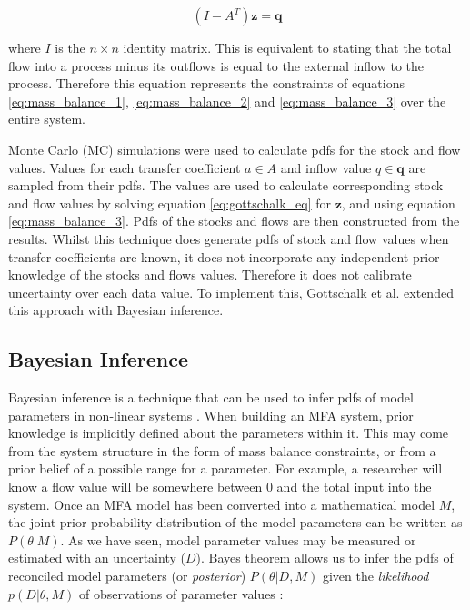 \documentclass[ %
                    author={Tom Jager},
                supervisor={Dr. Daniel Schien},
                    degree={MEng},
                     title={A Bayesian Inference Engine for Calibrating Uncertainty over UMIS Structured MFA Systems},
                  subtitle={},
                      type={research},
                      year={2019} ]{dissertation}
\begin{document}
\begin{equation}
\label{eq:gottschalk_eq}
    (I-A^T)\bm{z} = \bm{q}
\end{equation}

where $I$ is the $n \times n$ identity matrix. This is equivalent to stating that the total flow into a process minus its outflows is equal to the external inflow to the process. Therefore this equation represents the constraints of equations \ref{eq:mass_balance_1}, \ref{eq:mass_balance_2} and \ref{eq:mass_balance_3} over the entire system.

Monte Carlo (MC) simulations were used to calculate pdfs for the stock and flow values. Values for each transfer coefficient $a \in A$ and inflow value $q \in \bm{q}$ are sampled from their pdfs. The values are used to calculate corresponding stock and flow values by solving equation \ref{eq:gottschalk_eq} for $\bm{z}$, and using equation \ref{eq:mass_balance_3}. Pdfs of the stocks and flows are then constructed from the results. Whilst this technique does generate pdfs of stock and flow values when transfer coefficients are known, it does not incorporate any independent prior knowledge of the stocks and flows values. Therefore it does not calibrate uncertainty over each data value. To implement this, Gottschalk et al. extended this approach with Bayesian inference.

\subsection{Bayesian Inference}
\label{sec:bayesian_inference}
Bayesian inference is a technique that can be used to infer pdfs of model parameters in non-linear systems \cite{green2015bayesian}. When building an MFA system, prior knowledge is implicitly defined about the parameters within it. This may come from the system structure in the form of mass balance constraints, or from a prior belief of a possible range for a parameter. For example, a researcher will know a flow value will be somewhere between 0 and the total input into the system. Once an MFA model has been converted into a mathematical model $M$, the joint prior probability distribution of the model parameters can be written as $P(\theta|M)$. As we have seen, model parameter values may be measured or estimated with an uncertainty ($D$). Bayes theorem allows us to infer the pdfs of reconciled model parameters (or \textit{posterior}) $P(\theta | D, M)$ given the \textit{likelihood} $p(D | \theta, M)$ of observations of parameter values \cite{lupton2018incremental}:
\end{document}
